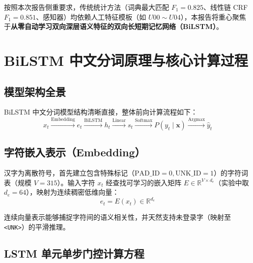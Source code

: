 \documentclass[11pt,a4paper]{ctexart}
\begin{document}
按照本次报告侧重要求，传统统计方法（词典最大匹配 $F_1=0.825$、线性链 CRF $F_1=0.851$、感知器）均依赖人工特征模板（如 $U00 \sim U04$），本报告将重心聚焦于\textbf{从零自动学习双向深层语义特征的双向长短期记忆网络（BiLSTM）}。

\section{BiLSTM 中文分词原理与核心计算过程}

\subsection{模型架构全景}

BiLSTM 中文分词模型结构清晰直接，整体前向计算流程如下：
\begin{equation}
    x_t \xrightarrow{\text{Embedding}} e_t \xrightarrow{\text{BiLSTM}} h_t \xrightarrow{\text{Linear}} s_t \xrightarrow{\text{Softmax}} P(y_t \mid \boldsymbol{x}) \xrightarrow{\text{Argmax}} \hat{y}_t
\end{equation}

\subsection{字符嵌入表示（Embedding）}

汉字为离散符号，首先建立包含特殊标记（$\text{PAD\_ID}=0, \text{UNK\_ID}=1$）的字符词表（规模 $V=315$）。输入字符 $x_t$ 经查找可学习的嵌入矩阵 $E \in \mathbb{R}^{V \times d_e}$（实验中取 $d_e = 64$），映射为连续稠密低维向量：
\begin{equation}
    e_t = E(x_t) \in \mathbb{R}^{d_e}
\end{equation}

连续向量表示能够捕捉字符间的语义相关性，并天然支持未登录字（映射至 \texttt{<UNK>}）的平滑推理。

\subsection{LSTM 单元单步门控计算方程}
\end{document}
